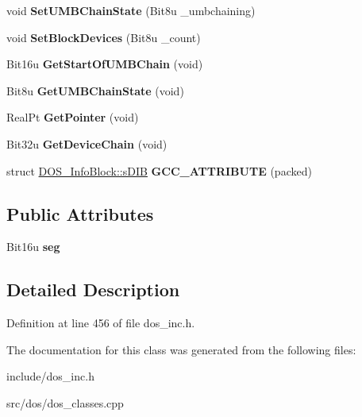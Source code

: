 \begin{DoxyCompactItemize}
\item 
\hypertarget{classDOS__InfoBlock_a4cfe16a819771ebc45bcbf89cc3a3d06}{void {\bfseries Set\-U\-M\-B\-Chain\-State} (Bit8u \-\_\-umbchaining)}\label{classDOS__InfoBlock_a4cfe16a819771ebc45bcbf89cc3a3d06}

\item 
\hypertarget{classDOS__InfoBlock_a1a37f96ed7976f3ef518b065dafabbf9}{void {\bfseries Set\-Block\-Devices} (Bit8u \-\_\-count)}\label{classDOS__InfoBlock_a1a37f96ed7976f3ef518b065dafabbf9}

\item 
\hypertarget{classDOS__InfoBlock_adb819f949bb84a57ec47b3eadcf8394b}{Bit16u {\bfseries Get\-Start\-Of\-U\-M\-B\-Chain} (void)}\label{classDOS__InfoBlock_adb819f949bb84a57ec47b3eadcf8394b}

\item 
\hypertarget{classDOS__InfoBlock_a77f19be942b10a316e54464547cfb2e2}{Bit8u {\bfseries Get\-U\-M\-B\-Chain\-State} (void)}\label{classDOS__InfoBlock_a77f19be942b10a316e54464547cfb2e2}

\item 
\hypertarget{classDOS__InfoBlock_a872b7fd95a7af22e303971abffc41e86}{Real\-Pt {\bfseries Get\-Pointer} (void)}\label{classDOS__InfoBlock_a872b7fd95a7af22e303971abffc41e86}

\item 
\hypertarget{classDOS__InfoBlock_a79370f3f9f5a228c2b584b330b912dcc}{Bit32u {\bfseries Get\-Device\-Chain} (void)}\label{classDOS__InfoBlock_a79370f3f9f5a228c2b584b330b912dcc}

\item 
\hypertarget{classDOS__InfoBlock_a492f63514c4bc0a876008bd5dffbefb4}{struct \hyperlink{structDOS__InfoBlock_1_1sDIB}{D\-O\-S\-\_\-\-Info\-Block\-::s\-D\-I\-B} {\bfseries G\-C\-C\-\_\-\-A\-T\-T\-R\-I\-B\-U\-T\-E} (packed)}\label{classDOS__InfoBlock_a492f63514c4bc0a876008bd5dffbefb4}

\end{DoxyCompactItemize}
\subsection*{Public Attributes}
\begin{DoxyCompactItemize}
\item 
\hypertarget{classDOS__InfoBlock_ae1079089060526859c4394a55d3153ee}{Bit16u {\bfseries seg}}\label{classDOS__InfoBlock_ae1079089060526859c4394a55d3153ee}

\end{DoxyCompactItemize}


\subsection{Detailed Description}


Definition at line 456 of file dos\-\_\-inc.\-h.



The documentation for this class was generated from the following files\-:\begin{DoxyCompactItemize}
\item 
include/dos\-\_\-inc.\-h\item 
src/dos/dos\-\_\-classes.\-cpp\end{DoxyCompactItemize}
